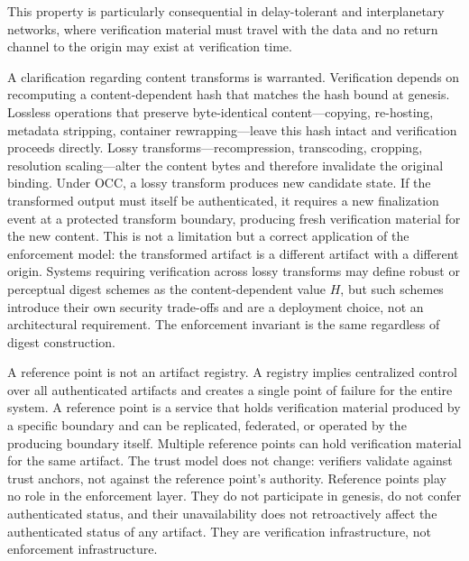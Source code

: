 \documentclass[11pt,letterpaper]{article}
\theoremstyle{occplain}
\theoremstyle{occremark}
\begin{document}
This property is particularly consequential in delay-tolerant and interplanetary networks, where verification material must travel with the data and no return channel to the origin may exist at verification time.

A clarification regarding content transforms is warranted. Verification depends on recomputing a content-dependent hash that matches the hash bound at genesis. Lossless operations that preserve byte-identical content---copying, re-hosting, metadata stripping, container rewrapping---leave this hash intact and verification proceeds directly. Lossy transforms---recompression, transcoding, cropping, resolution scaling---alter the content bytes and therefore invalidate the original binding. Under OCC, a lossy transform produces new candidate state. If the transformed output must itself be authenticated, it requires a new finalization event at a protected transform boundary, producing fresh verification material for the new content. This is not a limitation but a correct application of the enforcement model: the transformed artifact is a different artifact with a different origin. Systems requiring verification across lossy transforms may define robust or perceptual digest schemes as the content-dependent value $H$, but such schemes introduce their own security trade-offs and are a deployment choice, not an architectural requirement. The enforcement invariant is the same regardless of digest construction.

A reference point is not an artifact registry. A registry implies centralized control over all authenticated artifacts and creates a single point of failure for the entire system. A reference point is a service that holds verification material produced by a specific boundary and can be replicated, federated, or operated by the producing boundary itself. Multiple reference points can hold verification material for the same artifact. The trust model does not change: verifiers validate against trust anchors, not against the reference point's authority. Reference points play no role in the enforcement layer. They do not participate in genesis, do not confer authenticated status, and their unavailability does not retroactively affect the authenticated status of any artifact. They are verification infrastructure, not enforcement infrastructure.
\end{document}
